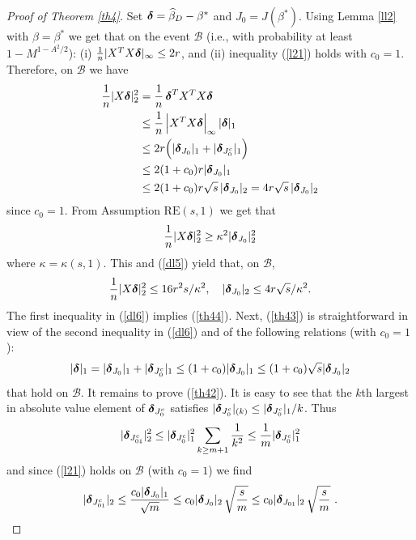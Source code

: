 \documentclass[dvips,aos]{imsart}
\numberwithin{equation}{section}
\theoremstyle{plain}
\def\B{\mbox{$\mathcal B$}}
\def\RE#1#2{$\text{RE}(#1,#2)$}
\newcommand{\bD}{\mbox{\boldmath$\delta$}}
\newcommand{\bb}{\mbox{\boldmath$\beta$}}
\def\bb{\beta}
\begin{document}
\begin{proof}[Proof of Theorem \ref{th4}] Set $\bD=\widehat\bb_D-\bb^*$ and
$J_0=J(\bb^*)$. Using Lemma \ref{ll2} with $\beta=\bb^*$ we get
that on the event $\B$ (i.e., with probability at least
$1-M^{1-A^2/2}$): (i) $\frac{1}{n}|X^T X \bD|_\infty\le 2r$, and
(ii) inequality (\ref{l21}) holds with $c_0=1$. Therefore, on $\B$
we have
\begin{equation}\label{dl5}
\begin{split}
\frac{1}{n}|X \bD|_2^2&=\frac{1}{n}\, \bD^T X^T X \bD
\\
%
&\le \frac{1}{n}\, \Big|X^T X \bD\Big|_\infty\,|\bD|_1
\\
%
&\le 2r \Big(|\bD_{J_0}|_1 + |\bD_{J_0^c}|_1\Big)
\\
%
&\le 2(1+c_0)r |\bD_{J_0}|_1
\\
%
&\le 2(1+c_0)r\sqrt{s}\,|\bD_{J_0}|_2 = 4r \sqrt{s}\,|\bD_{J_0}|_2
\end{split}
\end{equation}
since $c_0=1$. From Assumption \RE s1 we get that
$$
\frac{1}{n}|X \bD|_2^2 \ge \kappa^2 |\bD_{J_0}|_2^2
$$
where $\kappa=\kappa(s,1)$. This and (\ref{dl5}) yield that,  on
$\B$,
\begin{equation}\begin{split}\label{dl6}
\frac{1}{n}|X \bD|_2^2 \le 16 r^2 s/\kappa^2, \quad |\bD_{J_{0}}|_2
\le 4 r \sqrt{s}/\kappa^2.
\end{split}\end{equation}
The first inequality in (\ref{dl6}) implies (\ref{th44}). Next,
(\ref{th43}) is straightforward in view of the second inequality in
(\ref{dl6}) and of the following relations (with $c_0=1$):
\begin{equation}\label{dl6a}
|\bD|_1= |\bD_{J_{0}}|_1 + |\bD_{J_{0}^c}|_1 \le
(1+c_0)|\bD_{J_{0}}|_1 \le (1+c_0)\sqrt{s}|\bD_{J_{0}}|_2
\end{equation}
that hold on $\B$. It remains to prove (\ref{th42}). It is easy to
see that the $k$th largest in absolute value element of
$\bD_{J_{0}^c}$ satisfies $|\bD_{J_{0}^c}|_{(k)}\le
|\bD_{J_{0}^c}|_1/k$. Thus
\begin{equation*}%
|\bD_{J_{01}^c}|_2^2 \le |\bD_{J_{0}^c}|_1^2 \sum_{k\ge
m+1}\frac1{k^2} \le \frac1{m}|\bD_{J_{0}^c}|_1^2
\end{equation*}
and since (\ref{l21}) holds on $\B$ (with $c_0=1$) we find
$$
|\bD_{J_{01}^c}|_2 \le \frac{c_0|\bD_{J_{0}}|_1}{\sqrt{m}} \le
c_0|\bD_{J_{0}}|_2 \,\sqrt{\frac{s}{m}}\le
c_0|\bD_{J_{01}}|_2\,\sqrt{\frac{s}{m}}\ .
$$
\end{proof}
\end{document}
